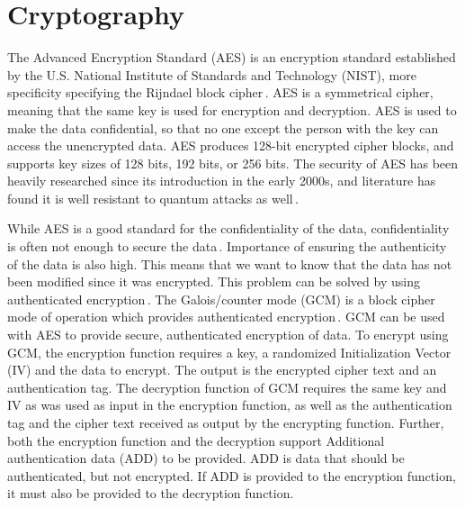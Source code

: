 \section{Cryptography}
\label{sec:back_crypto}
The Advanced Encryption Standard (\gls{AES}) is an encryption standard established by the U.S. National Institute of Standards and Technology (\gls{NIST}), more specificity specifying the Rijndael block cipher\,\cite{kumarvermaPerformanceAnalysisRC62012}. AES is a symmetrical cipher, meaning that the same key is used for encryption and decryption. AES is used to make the data confidential, so that no one except the person with the key can access the unencrypted data. AES produces 128-bit encrypted cipher blocks, and supports key sizes of 128 bits, 192 bits, or 256 bits. The security of AES has been heavily researched since its introduction in the early 2000s, and literature has found it is well resistant to quantum attacks as well\,\cite{bonnetainQuantumSecurityAnalysis2019}.

While AES is a good standard for the confidentiality of the data, confidentiality is often not enough to secure the data\,\cite{rosswallrabensteinWhenItComes2021}. Importance of ensuring the authenticity of the data is also high. This means that we want to know that the data has not been modified since it was encrypted. This problem can be solved by using authenticated encryption\,\cite{khovratovichAnswerWhyShould2013}. The Galois/counter mode (\gls{GCM}) is a block cipher mode of operation which provides authenticated encryption\,\cite{mcgrewGaloisCounterMode2004}. GCM can be used with AES to provide secure, authenticated encryption of data. To encrypt using GCM, the encryption function requires a key, a randomized Initialization Vector (\gls{IV}) and the data to encrypt. The output is the encrypted cipher text and an authentication tag. The decryption function of GCM requires the same key and IV as was used as input in the encryption function, as well as the authentication tag and the cipher text received as output by the encrypting function. Further, both the encryption function and the decryption support Additional authentication data (\gls{ADD}) to be provided. ADD is data that should be authenticated, but not encrypted. If ADD is provided to the encryption function, it must also be provided to the decryption function.

